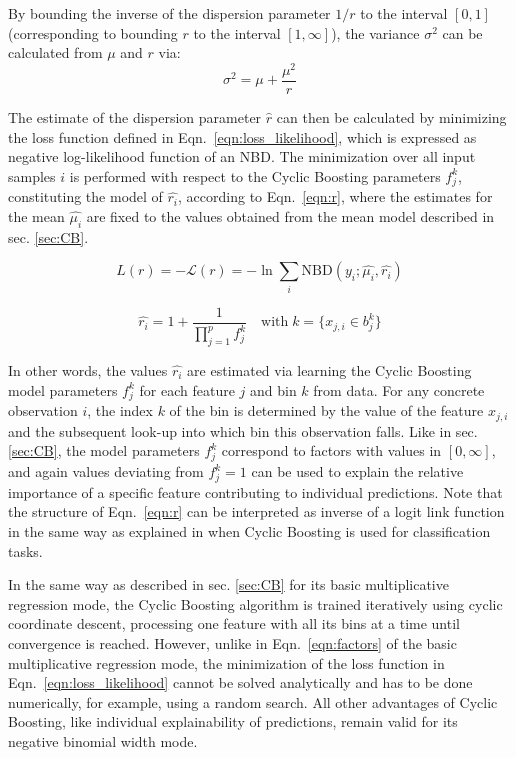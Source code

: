 \documentclass[BCOR=1mm, DIV=calc,10pt,
twoside=true,
twocolumn,
headings=normal]{scrartcl}
\newcommand{\eqn}{Eqn.~}
\begin{document}
By bounding the inverse of the dispersion parameter $1/r$ to the interval $[0, 1]$ (corresponding to bounding $r$ to the interval $[1, \infty]$), the variance $\sigma^2$ can be calculated from $\mu$ and $r$ via:
\begin{equation} \label{eqn:variance_r}
\sigma^2 = \mu + \frac{\mu^2}{r}
\end{equation}

The estimate of the dispersion parameter $\hat{r}$ can then be calculated by minimizing the loss function defined in \eqn \eqref{eqn:loss_likelihood}, which is expressed as negative log-likelihood function of an NBD. The minimization over all input samples $i$ is performed with respect to the Cyclic Boosting parameters $f^k_j$, constituting the model of $\hat{r_i}$, according to \eqn \eqref{eqn:r}, where the estimates for the mean $\hat{\mu_i}$ are fixed to the values obtained from the mean model described in sec. \ref{sec:CB}.

\begin{equation} \label{eqn:loss_likelihood}
L(r) = -\mathcal{L}(r) = -\ln \sum_i \mathrm{NBD}(y_i; \hat{\mu_i}, \hat{r_i})
\end{equation}

\begin{equation} \label{eqn:r}
\hat{r_i} = 1 +  \frac{1}{\prod \limits_{j=1}^p f^k_j} \quad \text{with}\; k=\{ x_{j,i} \in b^k_j\}
\end{equation}

In other words, the values $\hat{r_i}$ are estimated via learning the Cyclic Boosting model parameters $f^k_j$ for each feature $j$ and bin $k$ from data. For any concrete observation $i$, the index $k$ of the bin is determined by the value of the feature $x_{j,i}$ and the subsequent look-up into which bin this observation falls. Like in sec. \ref{sec:CB}, the model parameters $f^k_j$ correspond to factors with values in $[0, \infty]$, and again values deviating from $f^k_j=1$ can be used to explain the relative importance of a specific feature contributing to individual predictions. Note that the structure of \eqn \eqref{eqn:r} can be interpreted as inverse of a logit link function in the same way as explained in \cite{Wick2019} when Cyclic Boosting is used for classification tasks.

In the same way as described in sec. \ref{sec:CB} for its basic multiplicative regression mode, the Cyclic Boosting algorithm is trained iteratively using cyclic coordinate descent, processing one feature with all its bins at a time until convergence is reached. However, unlike in \eqn \eqref{eqn:factors} of the basic multiplicative regression mode, the minimization of the loss function in \eqn \eqref{eqn:loss_likelihood} cannot be solved analytically and has to be done numerically, for example, using a random search. All other advantages of Cyclic Boosting, like individual explainability of predictions, remain valid for its negative binomial width mode.
\end{document}
